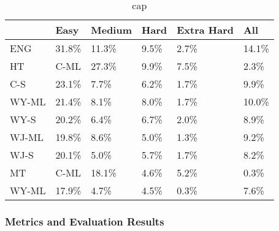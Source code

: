 \begin{table}[!ht]
    \centering
    \begin{tabular}{|l|l|l|l|l|l|}
        \hline

              & Easy   & Medium & Hard  & Extra Hard & All    \\ \hline
        ENG   & 31.8\% & 11.3\% & 9.5\% & 2.7\%      & 14.1\% \\ \hline
        HT    & C-ML   & 27.3\% & 9.9\% & 7.5\%      & 2.3\%  \\ \hline
        C-S   & 23.1\% & 7.7\%  & 6.2\% & 1.7\%      & 9.9\%  \\ \hline
        WY-ML & 21.4\% & 8.1\%  & 8.0\% & 1.7\%      & 10.0\% \\ \hline
        WY-S  & 20.2\% & 6.4\%  & 6.7\% & 2.0\%      & 8.9\%  \\ \hline
        WJ-ML & 19.8\% & 8.6\%  & 5.0\% & 1.3\%      & 9.2\%  \\ \hline
        WJ-S  & 20.1\% & 5.0\%  & 5.7\% & 1.7\%      & 8.2\%  \\ \hline
        MT    & C-ML   & 18.1\% & 4.6\% & 5.2\%      & 0.3\%  \\ \hline
        WY-ML & 17.9\% & 4.7\%  & 4.5\% & 0.3\%      & 7.6\%  \\ \hline
    \end{tabular}
    \label{lbl}
    \caption{cap}
\end{table}

\subsubsection{Metrics and Evaluation Results}